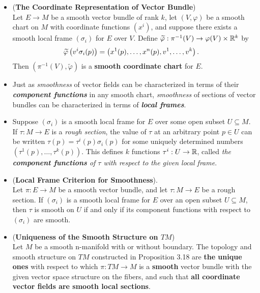 \documentclass[11pt]{article}
\begin{document}
\begin{itemize}
\item \begin{corollary} (\textbf{The Coordinate Representation of Vector Bundle})\\
Let  $E \rightarrow M$  be a smooth vector bundle of rank $k$, let $(V, \varphi)$ be a smooth chart on $M$ with coordinate functions $(x^i)$, and suppose there exists a
smooth local frame $(\sigma_i)$ for $E$ over $V$. Define $\widetilde{\varphi}: \pi^{-1}(V) \rightarrow \varphi(V)  \times {\mathbb R}^k$ by
\begin{align}
\widetilde{\varphi}\left(v^{i} \sigma_i(p)\right) &= \left(x^1(p), \ldots, x^{n}(p), v^1, \ldots, v^{k}\right).   \label{eqn: coordinate_representation_vector_bundle_local_frame}
\end{align} Then $(\pi^{-1}(V), \widetilde{\varphi})$ is a \textbf{smooth coordinate chart} for $E$.
\end{corollary}

\item Just as \emph{smoothness} of vector fields can be characterized in terms of their \emph{\textbf{component functions}} in any smooth chart, \emph{smoothness} of sections of vector bundles can be characterized in terms of \emph{\textbf{local frames}}. 

\item \begin{definition} 
Suppose  $(\sigma_i)$ is a smooth local frame for $E$ over some open subset $U \subseteq M$. If $\tau: M \rightarrow E$ is a \emph{rough section}, the value of $\tau$ at
an arbitrary point $p \in U$ can be written $\tau(p) = \tau^{i}(p)\sigma_i(p)$ for some uniquely determined numbers $(\tau^1(p), \ldots, \tau^{k}(p))$. This defines $k$ functions $\tau^i: U \rightarrow {\mathbb R}$, called \emph{the \textbf{component functions} of $\tau$ with respect to the given local frame}.
\end{definition}

\item \begin{proposition}  (\textbf{Local Frame Criterion for Smoothness}).\\
Let $\pi: E \rightarrow M$ be a smooth vector bundle, and let $\tau: M \rightarrow E$ be a rough section. If  $(\sigma_i)$ is a smooth local frame for $E$ over an open subset $U \subseteq M$, then $\tau$ is smooth on $U$ if and only if its component functions with respect to $(\sigma_i)$ are smooth.
\end{proposition}


\item \begin{proposition} (\textbf{Uniqueness of the Smooth Structure on $TM$})\\
Let $M$ be a smooth n-manifold with or without boundary. The topology and smooth structure on $TM$ constructed in Proposition 3.18 are \textbf{the unique ones} with respect to which $\pi: TM \rightarrow M$ is a \textbf{smooth} vector bundle with the given vector space structure on the fibers, and such that \textbf{all coordinate vector fields are smooth local sections}.
\end{proposition}
\end{itemize}
\end{document}
